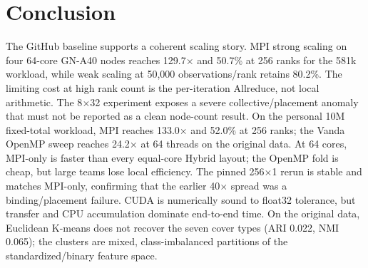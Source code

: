 \documentclass[10pt,a4paper]{article}
\begin{document}
\begin{table}[H]
\centering\small
\caption{PBS recovery/backup jobs submitted before report finalization.}
\label{tab:recovery}

\end{table}

\section{Conclusion}
The GitHub baseline supports a coherent scaling story. MPI strong scaling on
four 64-core GN-A40 nodes reaches 129.7$\times$ and 50.7\% at 256 ranks for the
581k workload, while weak scaling at 50,000 observations/rank retains 80.2\%.
The limiting cost at high rank count is the per-iteration Allreduce, not local
arithmetic. The 8$\times$32 experiment exposes a severe collective/placement
anomaly that must not be reported as a clean node-count result. On the
personal 10M fixed-total workload, MPI reaches 133.0$\times$ and 52.0\% at 256
ranks; the Vanda OpenMP sweep reaches 24.2$\times$ at 64 threads on the
original data. At 64 cores, MPI-only is faster than every equal-core Hybrid
layout; the OpenMP fold is cheap, but large teams lose local efficiency. The pinned 256$\times$1 rerun is
stable and matches MPI-only, confirming that the earlier 40$\times$ spread was
a binding/placement failure. CUDA is numerically sound to float32 tolerance,
but transfer and CPU accumulation dominate end-to-end time. On the original
data, Euclidean K-means does not recover the seven cover types (ARI 0.022,
NMI 0.065); the clusters are mixed, class-imbalanced partitions of the
standardized/binary feature space.
\end{document}
